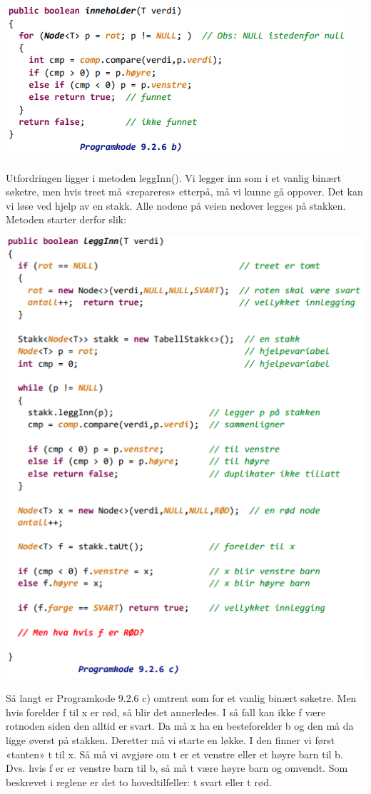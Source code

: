 \documentclass[11pt]{article}
\begin{document}
        \includegraphics[center]{pk-9.2.6b.png}

        Utfordringen ligger i metoden leggInn(). Vi legger inn som i et vanlig binært søketre, men
        hvis treet må «repareres» etterpå, må vi kunne gå oppover. Det kan vi løse ved hjelp av en
        stakk. Alle nodene på veien nedover legges på stakken. Metoden starter derfor slik:

        \includegraphics[center]{pk-9.2.6c.png}

        Så langt er Programkode 9.2.6 c) omtrent som for et vanlig binært søketre. Men hvis forelder
        f til x er rød, så blir det annerledes. I så fall kan ikke f være rotnoden siden den alltid er
        svart. Da må x ha en besteforelder b og den må da ligge øverst på stakken. Deretter må vi
        starte en løkke. I den finner vi først «tanten» t til x. Så må vi avgjøre om t er et venstre eller
        et høyre barn til b. Dvs. hvis f er er venstre barn til b, så må t være høyre barn og omvendt.
        Som beskrevet i reglene er det to hovedtilfeller: t svart eller t rød.
\end{document}
